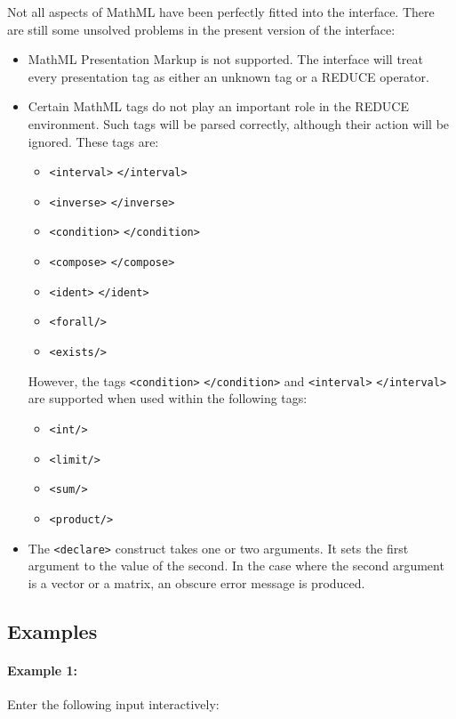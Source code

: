 Not all aspects of MathML have been perfectly fitted into the
interface.  There are still some unsolved problems in the present
version of the interface:
\begin{itemize}
\item MathML Presentation Markup is not supported.  The interface will
  treat every presentation tag as either an unknown tag or a REDUCE
  operator.
\item Certain MathML tags do not play an important role in the REDUCE
  environment.  Such tags will be parsed correctly, although their
  action will be ignored.  These tags are:
  \begin{itemize}
  \item \verb|<interval>| \verb|</interval>|
  \item \verb|<inverse>| \verb|</inverse>|
  \item \verb|<condition>| \verb|</condition>|
  \item \verb|<compose>| \verb|</compose>|
  \item \verb|<ident>| \verb|</ident>|
  \item \verb|<forall/>|
  \item \verb|<exists/>|
  \end{itemize}
  However, the tags \verb|<condition>| \verb|</condition>| and
  \verb|<interval>| \verb|</interval>| are supported when used within
  the following tags:
  \begin{itemize}
  \item \verb|<int/>|
  \item \verb|<limit/>|
  \item \verb|<sum/>|
  \item \verb|<product/>|
  \end{itemize}
\item The \verb|<declare>| construct takes one or two arguments.  It
  sets the first argument to the value of the second.  In the case
  where the second argument is a vector or a matrix, an obscure error
  message is produced.
\end{itemize}

\subsection{Examples}

\paragraph{Example 1:} Enter the following input interactively:

